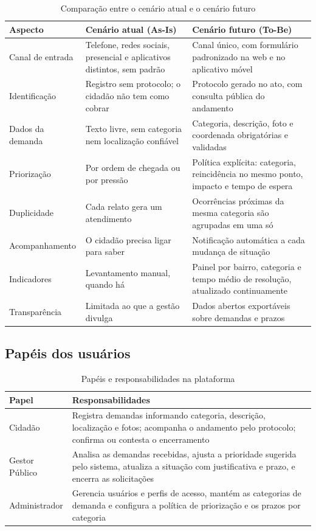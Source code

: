\documentclass[12pt,a4paper,oneside]{article}
\newcommand{\fonte}[1]{\par\vspace{5pt}{\footnotesize\singlespacing Fonte: #1\par}}
\newcommand{\cab}[1]{\textbf{\footnotesize #1}}
\begin{document}
\begin{table}[H]
\centering
\caption{Comparação entre o cenário atual e o cenário futuro}
\label{tab:asis}
{\small\singlespacing
\begin{tabularx}{\textwidth}{L{2.8cm} X X}
\toprule
\cab{Aspecto} & \cab{Cenário atual (As-Is)} & \cab{Cenário futuro (To-Be)} \\
\midrule
Canal de entrada & Telefone, redes sociais, presencial e aplicativos distintos,
sem padrão & Canal único, com formulário padronizado na web e no aplicativo
móvel \\
Identificação & Registro sem protocolo; o cidadão não tem como cobrar &
Protocolo gerado no ato, com consulta pública do andamento \\
Dados da demanda & Texto livre, sem categoria nem localização confiável &
Categoria, descrição, foto e coordenada obrigatórias e validadas \\
Priorização & Por ordem de chegada ou por pressão & Política explícita:
categoria, reincidência no mesmo ponto, impacto e tempo de espera \\
Duplicidade & Cada relato gera um atendimento & Ocorrências próximas da mesma
categoria são agrupadas em uma só \\
Acompanhamento & O cidadão precisa ligar para saber & Notificação automática a
cada mudança de situação \\
Indicadores & Levantamento manual, quando há & Painel por bairro, categoria e
tempo médio de resolução, atualizado continuamente \\
Transparência & Limitada ao que a gestão divulga & Dados abertos exportáveis
sobre demandas e prazos \\
\bottomrule
\end{tabularx}}
\fonte{elaborado pelos autores (2026).}
\end{table}

\subsection{Papéis dos usuários}

\begin{table}[H]
\centering
\caption{Papéis e responsabilidades na plataforma}
\label{tab:papeis}
{\small\singlespacing
\begin{tabularx}{\textwidth}{L{3.0cm} X}
\toprule
\cab{Papel} & \cab{Responsabilidades} \\
\midrule
Cidadão & Registra demandas informando categoria, descrição, localização e
fotos; acompanha o andamento pelo protocolo; confirma ou contesta o
encerramento \\
Gestor Público & Analisa as demandas recebidas, ajusta a prioridade sugerida
pelo sistema, atualiza a situação com justificativa e prazo, e encerra as
solicitações \\
Administrador & Gerencia usuários e perfis de acesso, mantém as categorias de
demanda e configura a política de priorização e os prazos por categoria \\
\bottomrule
\end{tabularx}}
\fonte{elaborado pelos autores (2026), conforme os papéis previstos no enunciado
da atividade.}
\end{table}
\end{document}
